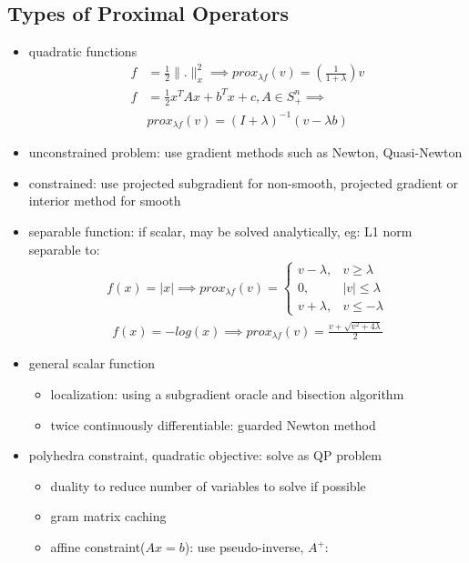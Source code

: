 \documentclass[8pt,letter]{article}
\begin{document}
\begin{multicols*}{2}
  \subsection{Types of Proximal Operators}
  \begin{itemize}
  \item quadratic functions
    \begin{align*}
      f&=\frac{1}{2} \|.\|_x^2 \implies prox_{\lambda f}(v) = (\frac{1}{1+\lambda})v\\
      f&=\frac{1}{2}x^T A x + b^T x + c, A \in S_+^n \implies\\
      &prox_{\lambda f}(v)=(I+\lambda)^{-1}(v-\lambda b)
    \end{align*}
  \item unconstrained problem: use gradient methods such as Newton, Quasi-Newton
  \item constrained: use projected subgradient for non-smooth, projected gradient or interior method for smooth
  \item separable function: if scalar, may be solved analytically, eg:
    L1 norm separable to:
    \begin{align*}
      f(x) = |x| \implies prox_{\lambda f}(v) =
      \begin{cases}
        v-\lambda ,& v \geq \lambda\\
        0,& |v| \leq \lambda\\
        v+\lambda, & v \leq -\lambda
      \end{cases}
    \end{align*}
    \begin{align*}
      f(x) = -log(x) \implies prox_{\lambda f}(v) = \frac{v+\sqrt{v^2+4\lambda}}{2}
    \end{align*}
  \item general scalar function
    \begin{itemize}
    \item localization: using a subgradient oracle and bisection algorithm
    \item twice continuously differentiable: guarded Newton method
    \end{itemize}
  \item polyhedra constraint, quadratic objective: solve as QP problem
    \begin{itemize}
    \item duality to reduce number of variables to solve if possible
    \item gram matrix caching
    \item affine constraint($Ax=b$): use pseudo-inverse, $A^{+}$:

\end{itemize}
\end{itemize}
\end{multicols*}
\end{document}
